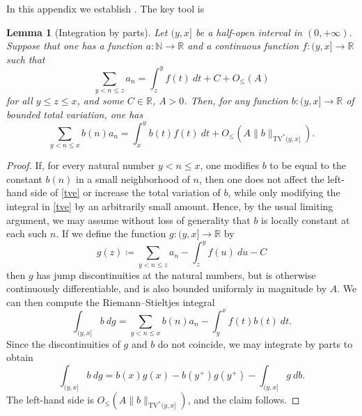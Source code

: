 \documentclass[10pt,a4paper,reqno]{amsart}
\numberwithin{equation}{section}
\theoremstyle{plain}
\newtheorem{lemma}[theorem]{Lemma}
\theoremstyle{definition}
\newcommand\R{\mathbb{R}}
\newcommand\N{\mathbb{N}}
\begin{document}
In this appendix we establish .  The key tool is

\begin{lemma}[Integration by parts]\label{integ-lemma}  Let $(y,x]$ be a half-open interval in $(0,+\infty)$.  Suppose that one has a function $a \colon \N \to \R$ and a continuous function $f: (y,x] \to \R$ such that 
  $$ \sum_{y < n \leq z} a_n = \int_z^y f(t)\ dt + C + O_{\leq}(A)$$
  for all $y \leq z \leq x$, and some $C \in \R$, $A>0$.  Then, for any function $b: (y,x] \to \R$ of bounded total variation, one has
\begin{equation}\label{tve}
   \sum_{y < n \leq x} b(n) a_n = \int_x^y b(t) f(t)\ dt + O_{\leq}(A\|b\|_{\mathrm{TV}^*(y,x]}).
\end{equation}
\end{lemma}

\begin{proof}  If, for every natural number $y < n \leq x$, one modifies $b$ to be equal to the constant $b(n)$ in a small neighborhood of $n$, then one does not affect the left-hand side of \eqref{tve} or increase the total variation of $b$, while only modifying the integral in \eqref{tve} by an arbitrarily small amount.  Hence, by the usual limiting argument, we may assume without loss of generality that $b$ is locally constant at each such $n$.  If we define the function $g \colon (y,x] \to \R$ by
$$ g(z) \coloneqq  \sum_{y < n \leq z} a_n - \int_z^y f(u)\ du - C$$
then $g$ has jump discontinuities at the natural numbers, but is otherwise continuously differentiable, and is also bounded uniformly in magnitude by $A$.  We can then compute the Riemann--Stieltjes integral
$$ \int_{(y,x]} b\ dg = \sum_{y < n \leq x} b(n) a_n - \int_y^x f(t) b(t)\ dt.$$
Since the discontinuities of $g$ and $b$ do not coincide, we may integrate by parts to obtain
$$ \int_{(y,x]} b\ dg = b(x) g(x) - b(y^+) g(y^+) - \int_{(y,x]} g\ db.$$
The left-hand side is $O_{\leq}(A \|b\|_{\mathrm{TV}^*(y,x]})$, and the claim follows.
\end{proof}
\end{document}
